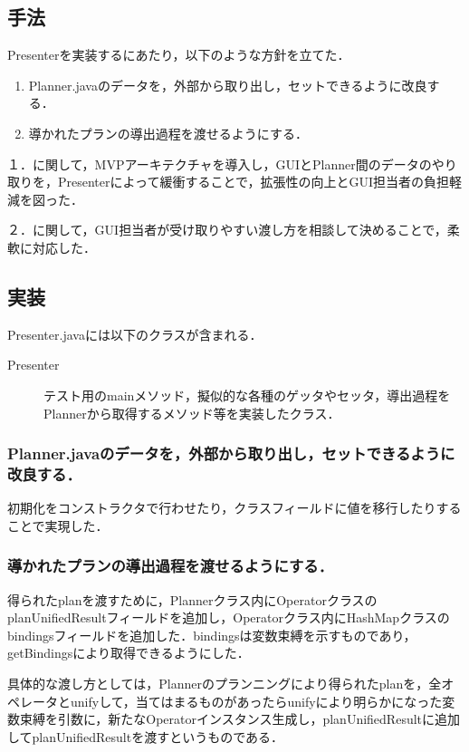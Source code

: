 \documentclass[12pt]{jarticle}
\begin{document}
\subsection{手法}
Presenterを実装するにあたり，以下のような方針を立てた．
\begin{enumerate}
\item Planner.javaのデータを，外部から取り出し，セットできるように改良する．
\item 導かれたプランの導出過程を渡せるようにする．
\end{enumerate}

１．に関して，MVPアーキテクチャを導入し，GUIとPlanner間のデータのやり取りを，Presenterによって緩衝することで，拡張性の向上とGUI担当者の負担軽減を図った．

２．に関して，GUI担当者が受け取りやすい渡し方を相談して決めることで，柔軟に対応した． \\

\subsection{実装}
Presenter.javaには以下のクラスが含まれる．
\begin{description}
\item[Presenter] テスト用のmainメソッド，擬似的な各種のゲッタやセッタ，導出過程をPlannerから取得するメソッド等を実装したクラス．
\end{description}

\subsubsection{Planner.javaのデータを，外部から取り出し，セットできるように改良する．}
初期化をコンストラクタで行わせたり，クラスフィールドに値を移行したりすることで実現した．

\subsubsection{導かれたプランの導出過程を渡せるようにする．}
得られたplanを渡すために，Plannerクラス内にOperatorクラスのplanUnifiedResultフィールドを追加し，Operatorクラス内にHashMapクラスのbindingsフィールドを追加した．bindingsは変数束縛を示すものであり，getBindingsにより取得できるようにした．

具体的な渡し方としては，Plannerのプランニングにより得られたplanを，全オペレータとunifyして，当てはまるものがあったらunifyにより明らかになった変数束縛を引数に，新たなOperatorインスタンス生成し，planUnifiedResultに追加してplanUnifiedResultを渡すというものである．
\end{document}
